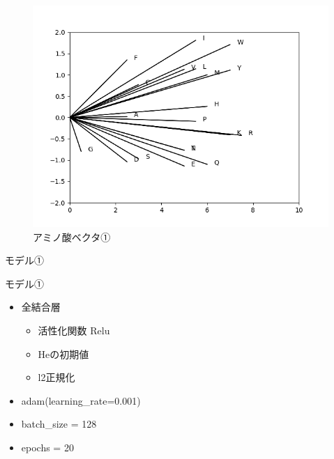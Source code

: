 \documentclass[dvipdfmx]{beamer}
\begin{document}
  \begin{frame}
    \begin{figure}
      \centering
      \includegraphics[keepaspectratio, scale=0.6]{images/amino_vector.png}
      \caption{アミノ酸ベクタ①}
    \end{figure}
  \end{frame}

  \begin{frame}{モデル①}
    \begin{block}{モデル①}
      \begin{itemize}
        \item 全結合層
        \begin{itemize}
          \item 活性化関数 \mbox{} Relu
          \item Heの初期値
          \item l2正規化
        \end{itemize}
        \item adam(learning\_rate=0.001)
        \item batch\_size = 128
        \item epochs = 20
      \end{itemize}
    \end{block}
  \end{frame}
\end{document}
